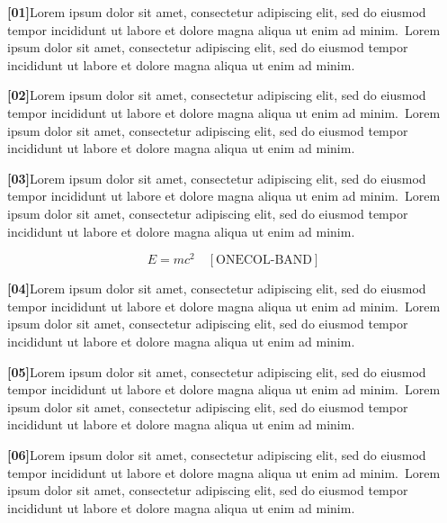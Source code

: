 \documentclass{article}
\newcommand\Body{Lorem ipsum dolor sit amet, consectetur adipiscing elit, sed do
eiusmod tempor incididunt ut labore et dolore magna aliqua ut enim ad minim.}
\newcommand\Par[1]{\par\noindent\textbf{[#1]}\space\Body\ \Body\par\medskip}
\begin{document}
\Par{01}\Par{02}\Par{03}
\begin{wideband}\[ E=mc^2 \quad[\text{ONECOL-BAND}] \]\end{wideband}
\Par{04}\Par{05}\Par{06}
\end{document}
